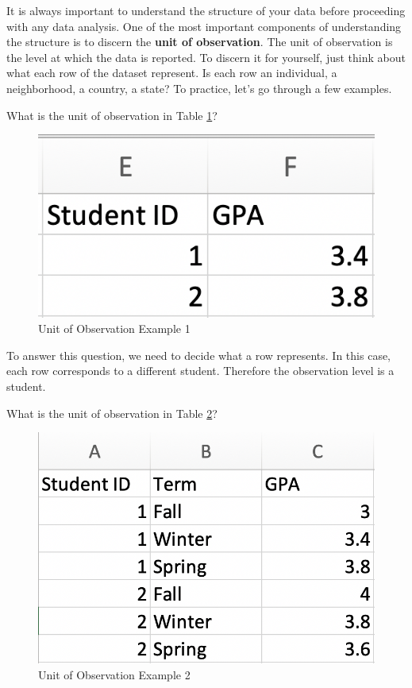 \documentclass[
]{book}
\begin{document}
It is always important to understand the structure of your data before proceeding with any data analysis. One of the most important components of understanding the structure is to discern the \textbf{unit of observation}. The unit of observation is the level at which the data is reported. To discern it for yourself, just think about what each row of the dataset represent. Is each row an individual, a neighborhood, a country, a state? To practice, let's go through a few examples.

What is the unit of observation in Table \ref{fig:student}?

\begin{figure}

{\centering \includegraphics[width=0.5\linewidth]{images/01_student} 

}

\caption{Unit of Observation Example 1}\label{fig:student}
\end{figure}

To answer this question, we need to decide what a row represents. In this case, each row corresponds to a different student. Therefore the observation level is a student.

What is the unit of observation in Table \ref{fig:studentterm}?

\begin{figure}

{\centering \includegraphics[width=0.55\linewidth]{images/01_student_term} 

}

\caption{Unit of Observation Example 2}\label{fig:studentterm}
\end{figure}
\end{document}
